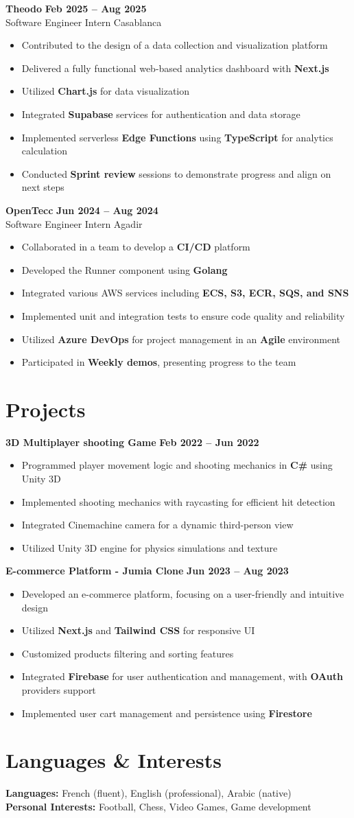 \documentclass[10pt,a4paper]{article}  %
\newcommand{\resumeSubheading}[4]{
    \vspace{6pt}
    \noindent\textbf{\large #1} \hfill \textbf{#2} \\  %
    {\small #3} \hfill {\small #4} \\ %
    \vspace{-8pt}
}
\newcommand{\projectSection}[2]{
    \vspace{6pt}
    \noindent\textbf{\large #1} \hfill \textbf{#2} \\  %
    \vspace{-8pt}
}
\newcommand{\resumeItem}[1]{
    \item #1
}
\begin{document}
\resumeSubheading
{Theodo}{Feb 2025 -- Aug 2025}
{Software Engineer Intern}{Casablanca}
\begin{itemize}
    \resumeItem{Contributed to the design of a data collection and visualization platform}
    \resumeItem{Delivered a fully functional web-based analytics dashboard with \textbf{Next.js}}
    \resumeItem{Utilized \textbf{Chart.js} for data visualization}
    \resumeItem{Integrated \textbf{Supabase} services for authentication and data storage}
    \resumeItem{Implemented serverless \textbf{Edge Functions} using \textbf{TypeScript} for analytics calculation}
    \resumeItem{Conducted \textbf{Sprint review} sessions to demonstrate progress and align on next steps}

\end{itemize}

\resumeSubheading   
{OpenTecc}{Jun 2024 -- Aug 2024}
{Software Engineer Intern}{Agadir}
\begin{itemize}
    \resumeItem{Collaborated in a team to develop a \textbf{CI/CD} platform}
    \resumeItem{Developed the Runner component using \textbf{Golang}}
    \resumeItem{Integrated various AWS services including \textbf{ECS, S3, ECR, SQS, and SNS}}
    \resumeItem{Implemented unit and integration tests to ensure code quality and reliability}
    \resumeItem{Utilized \textbf{Azure DevOps} for project management in an \textbf{Agile} environment}
    \resumeItem{Participated in \textbf{Weekly demos}, presenting progress to the team}
\end{itemize}
\section{Projects}

\projectSection
{3D Multiplayer shooting Game}{Feb 2022 -- Jun 2022}
\begin{itemize}
    \resumeItem{Programmed player movement logic and shooting mechanics in \textbf{C\#} using Unity 3D}
    \resumeItem{Implemented shooting mechanics with raycasting for efficient hit detection}
    \resumeItem{Integrated Cinemachine camera for a dynamic third-person view}    
    \resumeItem{Utilized Unity 3D engine for physics simulations and texture }
\end{itemize}

\projectSection
{E-commerce Platform - Jumia Clone}{Jun 2023 -- Aug 2023}
\begin{itemize}
    \resumeItem{Developed an e-commerce platform, focusing on a user-friendly and intuitive design}
    \resumeItem{Utilized \textbf{Next.js} and \textbf{Tailwind CSS} for responsive UI}
    \resumeItem{Customized products filtering and sorting features}
    \resumeItem{Integrated \textbf{Firebase} for user authentication and management, with \textbf{OAuth} providers support}
    \resumeItem{Implemented user cart management and persistence using \textbf{Firestore}}
\end{itemize}


\section{Languages \& Interests}
\noindent
\textbf{Languages:} French (fluent), English (professional), Arabic (native)\\
\textbf{Personal Interests:} Football, Chess, Video Games, Game development\\
\end{document}
